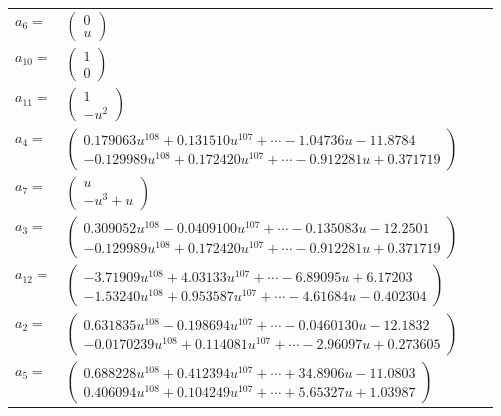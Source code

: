 \documentclass[1p]{elsarticle_modified}
\theoremstyle{definition}
\begin{document}
\begin{tabular}{m{7pt} m{180pt} m{7pt} m{180pt} }
\flushright $a_{6}=$&$\begin{pmatrix}0\\u\end{pmatrix}$ \\
\flushright $a_{10}=$&$\begin{pmatrix}1\\0\end{pmatrix}$ \\
\flushright $a_{11}=$&$\begin{pmatrix}1\\- u^2\end{pmatrix}$ \\
\flushright $a_{4}=$&$\begin{pmatrix}0.179063 u^{108}+0.131510 u^{107}+\cdots-1.04736 u-11.8784\\-0.129989 u^{108}+0.172420 u^{107}+\cdots-0.912281 u+0.371719\end{pmatrix}$ \\
\flushright $a_{7}=$&$\begin{pmatrix}u\\- u^3+u\end{pmatrix}$ \\
\flushright $a_{3}=$&$\begin{pmatrix}0.309052 u^{108}-0.0409100 u^{107}+\cdots-0.135083 u-12.2501\\-0.129989 u^{108}+0.172420 u^{107}+\cdots-0.912281 u+0.371719\end{pmatrix}$ \\
\flushright $a_{12}=$&$\begin{pmatrix}-3.71909 u^{108}+4.03133 u^{107}+\cdots-6.89095 u+6.17203\\-1.53240 u^{108}+0.953587 u^{107}+\cdots-4.61684 u-0.402304\end{pmatrix}$ \\
\flushright $a_{2}=$&$\begin{pmatrix}0.631835 u^{108}-0.198694 u^{107}+\cdots-0.0460130 u-12.1832\\-0.0170239 u^{108}+0.114081 u^{107}+\cdots-2.96097 u+0.273605\end{pmatrix}$ \\
\flushright $a_{5}=$&$\begin{pmatrix}0.688228 u^{108}+0.412394 u^{107}+\cdots+34.8906 u-11.0803\\0.406094 u^{108}+0.104249 u^{107}+\cdots+5.65327 u+1.03987\end{pmatrix}$ \\

\end{tabular}
\end{document}
